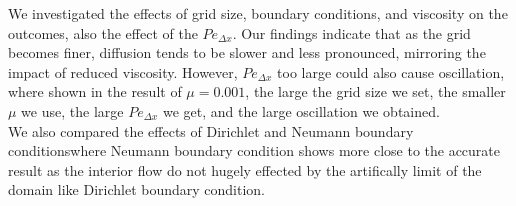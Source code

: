 \documentclass[12pt]{article}
\begin{document}
We investigated the effects of grid size, boundary conditions,
 and viscosity on the outcomes, also the effect of the 
 $Pe_{\Delta x}$. Our findings indicate that as 
 the grid becomes finer, diffusion tends to be slower 
 and less pronounced, mirroring the impact of reduced viscosity.
However, $Pe_{\Delta x}$ too large could also cause oscillation,
where shown in the result of $\mu = 0.001$, the large the grid size we set, the 
smaller $\mu$ we use, the large $Pe_{\Delta x}$
we get, and the large oscillation we obtained.\\


We also compared the effects of Dirichlet and 
Neumann boundary conditionswhere Neumann boundary condition 
shows more close
to the accurate result as the interior flow do not hugely 
effected by the artifically limit of the domain like Dirichlet 
boundary condition.























\newpage
\end{document}
